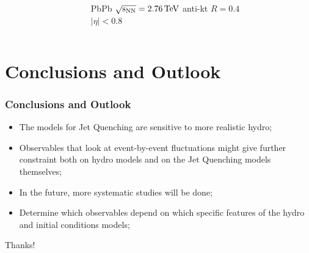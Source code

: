 \documentclass{beamer}
\begin{document}
\begin{frame}
\begin{columns}
\begin{column}{0.6\textwidth}
	\end{column}
    \begin{column}{0.4\textwidth}
	PbPb
	$\sqrt{\rm{s}_{\rm{NN}}} = 2.76 \, \rm{TeV}$
	anti-kt $R=0.4$ \\
	$\vert\eta\vert<0.8$
	\end{column}
	\end{columns}
\end{frame}

\section{Conclusions and Outlook}
\begin{frame}\frametitle{Conclusions and Outlook}
\begin{itemize}
	\item<2-> The models for Jet Quenching are sensitive to more realistic hydro;
	\item<3-> Observables that look at event-by-event fluctuations might give further constraint both on hydro models and on the Jet Quenching models themselves;
	\item<4-> In the future, more systematic studies will be done;
	\item<5-> Determine which observables depend on which specific features of the hydro and initial conditions models;
\end{itemize}
\end{frame}

\begin{frame}
\large Thanks!
\end{frame}
\end{document}
